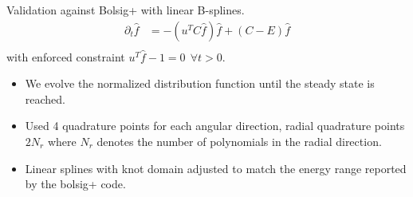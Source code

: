 \documentclass[mathserif, aspectratio=169]{beamer}
\begin{document}
\begin{frame}[fragile]
Validation against Bolsig+ with linear B-splines.
\begin{align*}
\partial_t \hat{f} &= -\left(u^T C \hat{f}\right) \hat{f} + (C-E) \hat{f} \\
\end{align*} with enforced constraint $u^T \hat{f} -1 = 0 \ \ \forall t>0$. 
\begin{itemize}
	\item We evolve the normalized distribution function until the steady state is reached. 
	\item Used 4 quadrature points for each angular direction, radial quadrature points $2N_r$ where $N_r$ denotes the number of polynomials in the radial direction. 
	\item Linear splines with knot domain adjusted to match the energy range reported by the bolsig+ code. 
\end{itemize}
\end{frame}
\end{document}
